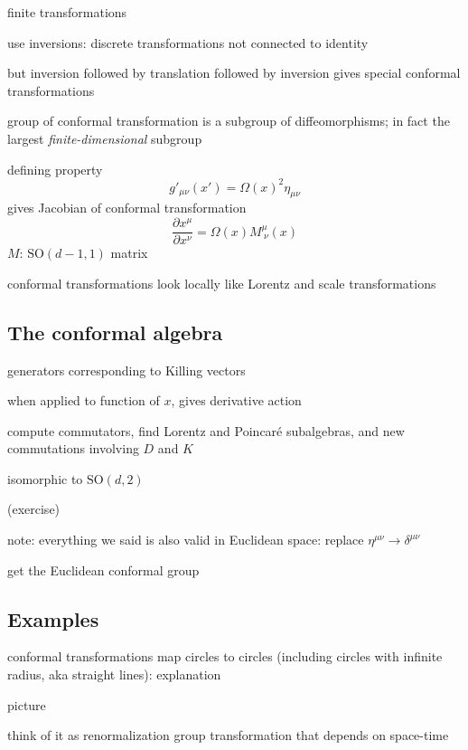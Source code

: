 \documentclass[a4paper,12pt]{article}
\newcommand{\SO}{\text{SO}}
\numberwithin{equation}{section}
\begin{document}
finite transformations


use inversions: discrete transformations not connected to identity

but inversion followed by translation followed by inversion gives special conformal transformations


group of conformal transformation is a subgroup of diffeomorphisms; in fact the largest \emph{finite-dimensional} subgroup



defining property
\begin{equation}
	g'_{\mu\nu}(x') = \Omega(x)^2 \eta_{\mu\nu}
\end{equation}
gives Jacobian of conformal transformation
\begin{equation}
	\frac{\partial x^\mu}{\partial x^\nu}
	= \Omega(x) M^\mu_{~\nu}(x)
\end{equation}
$M$: $\SO(d-1, 1)$ matrix

conformal transformations look locally like Lorentz and scale transformations


\subsection{The conformal algebra}

generators corresponding to Killing vectors

when applied to function of $x$, gives derivative action



compute commutators, find Lorentz and Poincaré subalgebras, and new commutations involving $D$ and $K$

isomorphic to $\SO(d, 2)$

(exercise)


note: everything we said is also valid in Euclidean space: replace $\eta^{\mu\nu} \to \delta^{\mu\nu}$

get the Euclidean conformal group



\subsection{Examples}

conformal transformations map circles to circles (including circles with infinite radius, aka straight lines): explanation

picture

think of it as renormalization group transformation that depends on space-time
\end{document}
